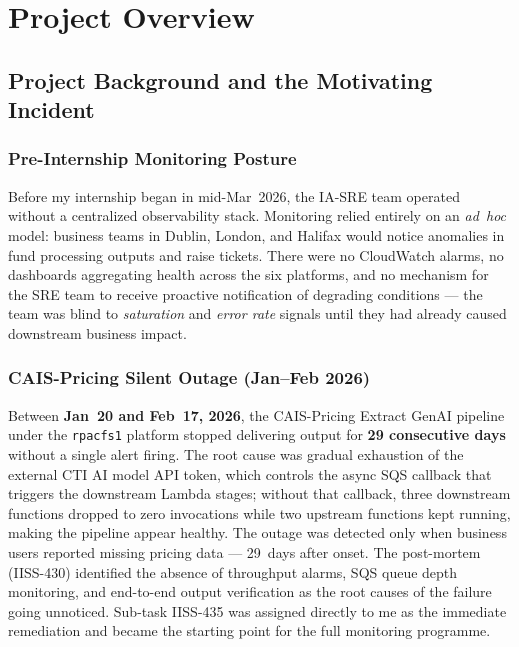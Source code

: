 
\chapter{Project Overview}
\label{chap:project}

\section{Project Background and the Motivating Incident}
\label{sec:project_background}

\subsection{Pre-Internship Monitoring Posture}

Before my internship began in mid-Mar~2026, the IA-SRE team operated
without a centralized observability stack. Monitoring relied entirely on
an \emph{ad~hoc} model: business teams in Dublin, London, and Halifax
would notice anomalies in fund processing outputs and raise tickets. There
were no CloudWatch alarms, no dashboards aggregating health across the six
platforms, and no mechanism for the SRE team to receive proactive
notification of degrading conditions --- the team was blind to
\emph{saturation} and \emph{error rate} signals until they had already
caused downstream business impact.

\subsection{CAIS-Pricing Silent Outage (Jan--Feb 2026)}
\label{sec:cais_silent_outage}

Between \textbf{Jan~20 and Feb~17, 2026}, the CAIS-Pricing Extract GenAI
pipeline under the \texttt{rpacfs1} platform stopped delivering output for
\textbf{29 consecutive days} without a single alert firing. The root cause
was gradual exhaustion of the external CTI AI model API token, which
controls the async SQS callback that triggers the downstream Lambda
stages; without that callback, three downstream functions dropped to zero
invocations while two upstream functions kept running, making the pipeline
appear healthy. The outage was detected only when business users reported
missing pricing data --- 29~days after onset. The post-mortem (IISS-430)
identified the absence of throughput alarms, SQS queue depth monitoring,
and end-to-end output verification as the root causes of the failure going
unnoticed. Sub-task IISS-435 was assigned directly to me as the immediate
remediation and became the starting point for the full monitoring programme.


